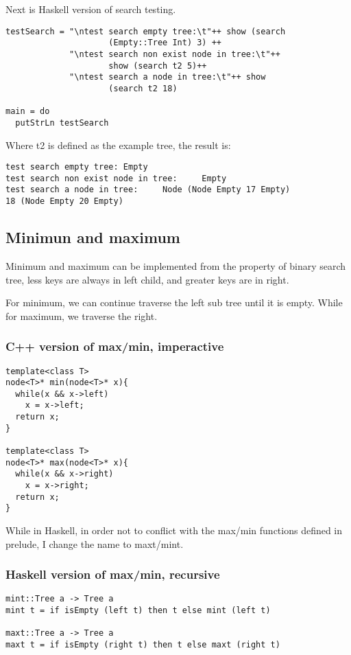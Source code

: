 \documentclass{article}
\begin{document}
Next is Haskell version of search testing.

\lstset{language=Haskell}
\begin{lstlisting}
testSearch = "\ntest search empty tree:\t"++ show (search 
                     (Empty::Tree Int) 3) ++
             "\ntest search non exist node in tree:\t"++ 
                     show (search t2 5)++
             "\ntest search a node in tree:\t"++ show 
                     (search t2 18)

main = do
  putStrLn testSearch
\end{lstlisting}

Where t2 is defined as the example tree, the result is:
\begin{verbatim}
test search empty tree: Empty
test search non exist node in tree:     Empty
test search a node in tree:     Node (Node Empty 17 Empty) 
18 (Node Empty 20 Empty)
\end{verbatim}


\subsection{Minimun and maximum}

Minimum and maximum can be implemented from the property of binary search
tree, less keys are always in left child, and greater keys are in right.

For minimum, we can continue traverse the left sub tree until it is empty.
While for maximum, we traverse the right.

\subsubsection*{C++ version of max/min, imperactive}

\lstset{language=c++}
\begin{lstlisting}
template<class T>
node<T>* min(node<T>* x){
  while(x && x->left)
    x = x->left;
  return x;
}

template<class T>
node<T>* max(node<T>* x){
  while(x && x->right)
    x = x->right;
  return x;
}
\end{lstlisting}

While in Haskell, in order not to conflict with the max/min functions 
defined in prelude, I change the name to maxt/mint.

\subsubsection*{Haskell version of max/min, recursive}
\lstset{language=Haskell}
\begin{lstlisting}
mint::Tree a -> Tree a
mint t = if isEmpty (left t) then t else mint (left t)

maxt::Tree a -> Tree a
maxt t = if isEmpty (right t) then t else maxt (right t)
\end{lstlisting}
\end{document}
